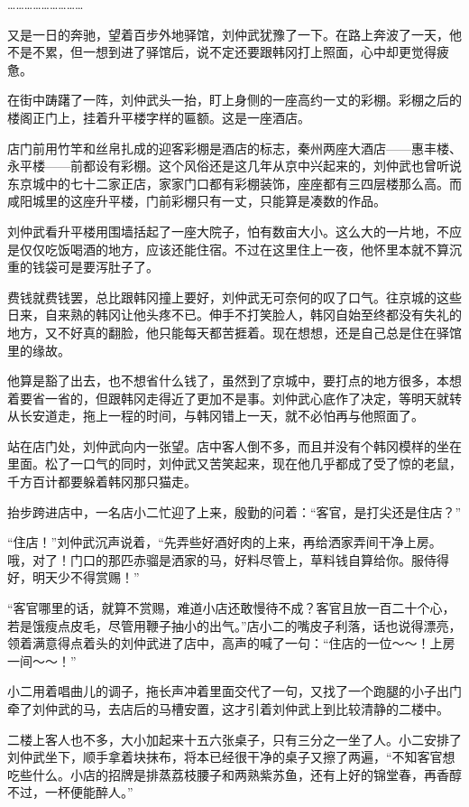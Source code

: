 ………………………

又是一日的奔驰，望着百步外地驿馆，刘仲武犹豫了一下。在路上奔波了一天，他不是不累，但一想到进了驿馆后，说不定还要跟韩冈打上照面，心中却更觉得疲惫。

在街中踌躇了一阵，刘仲武头一抬，盯上身侧的一座高约一丈的彩棚。彩棚之后的楼阁正门上，挂着升平楼字样的匾额。这是一座酒店。

店门前用竹竿和丝帛扎成的迎客彩棚是酒店的标志，秦州两座大酒店——惠丰楼、永平楼——前都设有彩棚。这个风俗还是这几年从京中兴起来的，刘仲武也曾听说东京城中的七十二家正店，家家门口都有彩棚装饰，座座都有三四层楼那么高。而咸阳城里的这座升平楼，门前彩棚只有一丈，只能算是凑数的作品。

刘仲武看升平楼用围墙括起了一座大院子，怕有数亩大小。这么大的一片地，不应是仅仅吃饭喝酒的地方，应该还能住宿。不过在这里住上一夜，他怀里本就不算沉重的钱袋可是要泻肚子了。

费钱就费钱罢，总比跟韩冈撞上要好，刘仲武无可奈何的叹了口气。往京城的这些日来，自来熟的韩冈让他头疼不已。伸手不打笑脸人，韩冈自始至终都没有失礼的地方，又不好真的翻脸，他只能每天都苦捱着。现在想想，还是自己总是住在驿馆里的缘故。

他算是豁了出去，也不想省什么钱了，虽然到了京城中，要打点的地方很多，本想着要省一省的，但跟韩冈走得近了更加不是事。刘仲武心底作了决定，等明天就转从长安道走，拖上一程的时间，与韩冈错上一天，就不必怕再与他照面了。

站在店门处，刘仲武向内一张望。店中客人倒不多，而且并没有个韩冈模样的坐在里面。松了一口气的同时，刘仲武又苦笑起来，现在他几乎都成了受了惊的老鼠，千方百计都要躲着韩冈那只猫走。

抬步跨进店中，一名店小二忙迎了上来，殷勤的问着：“客官，是打尖还是住店？”

“住店！”刘仲武沉声说着，“先弄些好酒好肉的上来，再给洒家弄间干净上房。哦，对了！门口的那匹赤骝是洒家的马，好料尽管上，草料钱自算给你。服侍得好，明天少不得赏赐！”

“客官哪里的话，就算不赏赐，难道小店还敢慢待不成？客官且放一百二十个心，若是饿瘦点皮毛，尽管用鞭子抽小的出气。”店小二的嘴皮子利落，话也说得漂亮，领着满意得点着头的刘仲武进了店中，高声的喊了一句：“住店的一位～～！上房一间～～！”

小二用着唱曲儿的调子，拖长声冲着里面交代了一句，又找了一个跑腿的小子出门牵了刘仲武的马，去店后的马槽安置，这才引着刘仲武上到比较清静的二楼中。

二楼上客人也不多，大小加起来十五六张桌子，只有三分之一坐了人。小二安排了刘仲武坐下，顺手拿着块抹布，将本已经很干净的桌子又擦了两遍，“不知客官想吃些什么。小店的招牌是排蒸荔枝腰子和两熟紫苏鱼，还有上好的锦堂春，再香醇不过，一杯便能醉人。”

